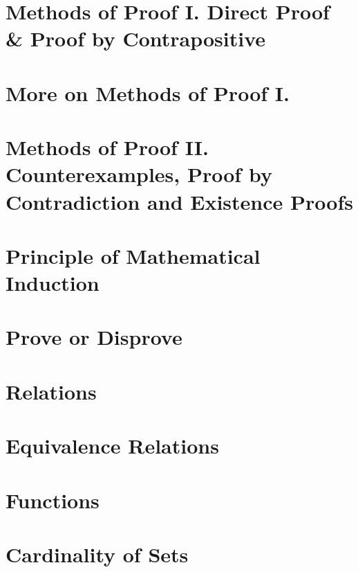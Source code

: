 \section{Methods of Proof I. Direct Proof \& Proof by Contrapositive}

\newpage

\section{More on Methods of Proof I.}

\newpage

\section{Methods of Proof II. Counterexamples, Proof by Contradiction and Existence Proofs}

\newpage

\section{Principle of Mathematical Induction}

\newpage

\section{Prove or Disprove}

\newpage

\section{Relations}

\newpage

\section{Equivalence Relations}

\newpage

\section{Functions}

\newpage

\section{Cardinality of Sets}

\newpage



